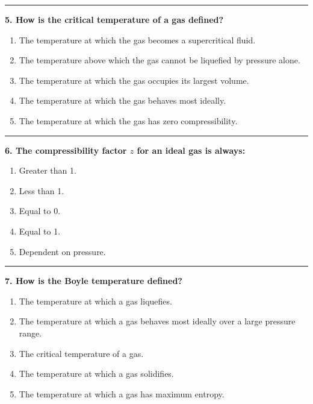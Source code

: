 \documentclass[
  9pt,
]{extbook}
\providecommand{\tightlist}{%
  \setlength{\itemsep}{0pt}\setlength{\parskip}{0pt}}
\theoremstyle{definition}
\theoremstyle{definition}
\theoremstyle{definition}
\theoremstyle{remark}
\begin{document}
\begin{center}\rule{0.5\linewidth}{0.5pt}\end{center}

\textbf{5. How is the critical temperature of a gas defined?}

\begin{enumerate}
\def\labelenumi{\alph{enumi}.}
\tightlist
\item
  The temperature at which the gas becomes a supercritical fluid.
\item
  The temperature above which the gas cannot be liquefied by pressure alone.
\item
  The temperature at which the gas occupies its largest volume.
\item
  The temperature at which the gas behaves most ideally.
\item
  The temperature at which the gas has zero compressibility.
\end{enumerate}

\begin{center}\rule{0.5\linewidth}{0.5pt}\end{center}

\textbf{6. The compressibility factor \(z\) for an ideal gas is always:}

\begin{enumerate}
\def\labelenumi{\alph{enumi}.}
\tightlist
\item
  Greater than 1.
\item
  Less than 1.
\item
  Equal to 0.
\item
  Equal to 1.
\item
  Dependent on pressure.
\end{enumerate}

\begin{center}\rule{0.5\linewidth}{0.5pt}\end{center}

\textbf{7. How is the Boyle temperature defined?}

\begin{enumerate}
\def\labelenumi{\alph{enumi}.}
\tightlist
\item
  The temperature at which a gas liquefies.
\item
  The temperature at which a gas behaves most ideally over a large pressure range.
\item
  The critical temperature of a gas.
\item
  The temperature at which a gas solidifies.
\item
  The temperature at which a gas has maximum entropy.
\end{enumerate}
\end{document}
